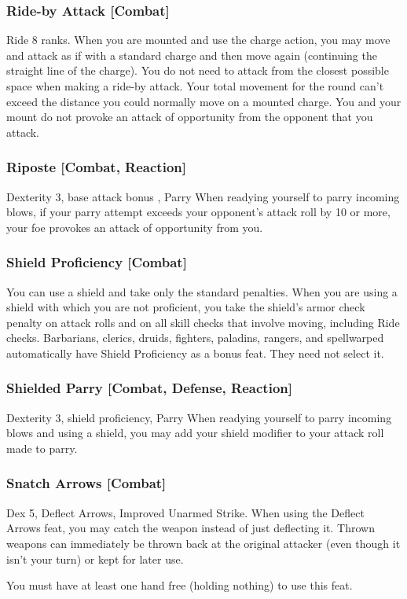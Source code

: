 \subsubsection{Ride-by Attack [Combat]}
\featpre Ride 8 ranks.
 When you are mounted and use the charge action, you may move and attack as if with a standard charge and then move again (continuing the straight line of the charge). You do not need to attack from the closest possible space when making a ride-by attack. Your total movement for the round can't exceed the distance you could normally move on a mounted charge. You and your mount do not provoke an attack of opportunity from the opponent that you attack.

\subsubsection{Riposte [Combat, Reaction]}
\featpre Dexterity 3, base attack bonus , Parry
\featben When readying yourself to parry incoming blows, if your parry attempt exceeds your opponent's attack roll by 10 or more, your foe provokes an attack of opportunity from you.

\subsubsection{Shield Proficiency [Combat]}
 You can use a shield and take only the standard penalties.
 When you are using a shield with which you are not proficient, you take the shield's armor check penalty on attack rolls and on all skill checks that involve moving, including Ride checks.
 Barbarians, clerics, druids, fighters, paladins, rangers, and spellwarped automatically have Shield Proficiency as a bonus feat. They need not select it.

\subsubsection{Shielded Parry [Combat, Defense, Reaction]}
\featpres Dexterity 3, shield proficiency, Parry
\featben When readying yourself to parry incoming blows and using a shield, you may add your shield modifier to your attack roll made to parry.
\subsubsection{Snatch Arrows [Combat]}
 Dex 5, Deflect Arrows, Improved Unarmed Strike.
 When using the Deflect Arrows feat, you may catch the weapon instead of just deflecting it. Thrown weapons can immediately be thrown back at the original attacker (even though it isn't your turn) or kept for later use.
\par You must have at least one hand free (holding nothing) to use this feat.%

